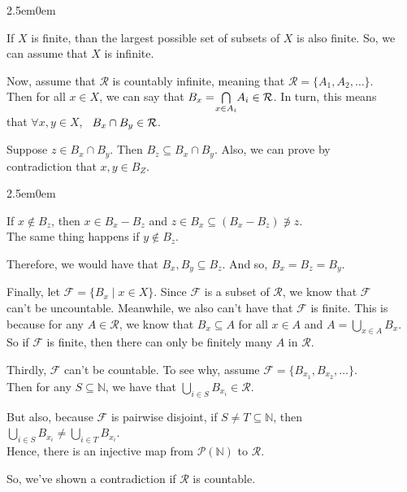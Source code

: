 \documentclass{book}
\newcommand{\exTwo}{%
   \color{RedViolet}%
   \fontsize{13}{15}\selectfont%
}
\newcommand{\exP}{%
   \color{VioletRed}%
   \fontsize{12}{14}\selectfont%
}
\newenvironment{myIndent}{%
   \begin{adjustwidth}{2.5em}{0em}%
}{%
   \end{adjustwidth}%
}
\newcommand{\myHS}{ \hspace{0.5em}}
\newcommand{\retTwo}{\hfill\bigbreak}
\begin{document}
{\begin{myIndent}\exTwo
   If $X$ is finite, than the largest possible set of subsets of $X$ is also finite. So, we\\ can assume that $X$ is infinite.

   
   \newpage

   Now, assume that $\mathcal{R}$ is countably infinite, meaning that $\mathcal{R} = \{A_1, A_2, \ldots\}$.\\ Then for all $x \in X$, we can say that $B_x = \hspace{-0.2em}\bigcap\limits_{x \in A_i}\hspace{-0.2em}A_i \in \mathcal{R}$. In turn, this means\\ [-8pt] that $\forall x, y \in X$, $\myHS B_x \cap B_y \in \mathcal{R}$.\retTwo
   
   Suppose $z \in B_x \cap B_y$. Then $B_z \subseteq B_x \cap B_y$. Also, we can prove by\\ contradiction that $x, y \in B_Z$.
   {\begin{myIndent}\exP
      If $x \notin B_z$, then $x \in B_x - B_z$ and $z \in B_x \subseteq (B_x - B_z) \not\ni z$.\\ The same thing happens if $y \notin B_z$.\retTwo
   \end{myIndent}}

   Therefore, we would have that $B_x, B_y \subseteq B_z$. And so, $B_x = B_z = B_y$.\retTwo

   Finally, let $\mathcal{F} = \{B_x \mid x \in X\}$. Since $\mathcal{F}$ is a subset of $\mathcal{R}$, we know that $\mathcal{F}$\\ can't be uncountable. Meanwhile, we also can't have that $\mathcal{F}$ is finite. This is\\ because for any $A \in \mathcal{R}$, we know that $B_x \subseteq A$ for all $x \in A$ and $A = \bigcup\limits_{x \in A}B_x$.\\ [-8pt] So if $\mathcal{F}$ is finite, then there can only be finitely many $A$ in $\mathcal{R}$.\retTwo

   Thirdly, $\mathcal{F}$ can't be countable. To see why, assume $\mathcal{F} = \{B_{x_1}, B_{x_2}, \ldots\}$.\\ Then for any $S \subseteq \mathbb{N}$, we have that $\bigcup\limits_{i\in S}B_{x_i} \in \mathcal{R}$.\retTwo
   
   But also, because $\mathcal{F}$ is pairwise disjoint, if $S \neq T \subseteq \mathbb{N}$, then $\bigcup\limits_{i\in S}B_{x_i}  \neq \bigcup\limits_{i\in T}B_{x_i}$.\\ [-8pt] Hence, there is an injective map from $\mathcal{P}(\mathbb{N})$ to $\mathcal{R}$.\retTwo
   
   So, we've shown a contradiction if $\mathcal{R}$ is countable.\retTwo
\end{myIndent}}
\end{document}
